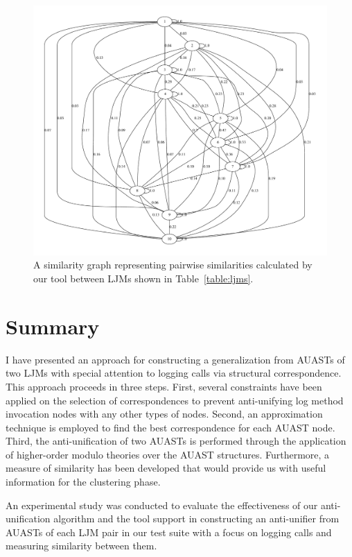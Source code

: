 \begin{figure} [H]
  \centering\includegraphics [width = \textwidth]{graphviz/au.pdf}
  \caption{A similarity graph representing pairwise similarities calculated by our tool between LJMs shown in Table~\ref{table:ljms}.}
  \label{fig:au_graph}
\end{figure}




\section{Summary} \label{meth1-summary}
I have presented an approach for constructing a generalization from AUASTs of two LJMs with special attention to logging calls via structural correspondence. This approach proceeds in three steps. First, several constraints have been applied on the selection of correspondences to prevent anti-unifying log method invocation nodes with any other types of nodes. Second, an approximation technique is employed to find the best correspondence for each AUAST node. Third, the anti-unification of two AUASTs is performed through the application of higher-order modulo theories over the AUAST structures. Furthermore, a measure of similarity has been developed that would provide us with useful information for the clustering phase. 

An experimental study was conducted to evaluate the effectiveness of our anti-unification algorithm and the tool support in constructing an anti-unifier from AUASTs of each LJM pair in our test suite with a focus on logging calls and measuring similarity between them. 



